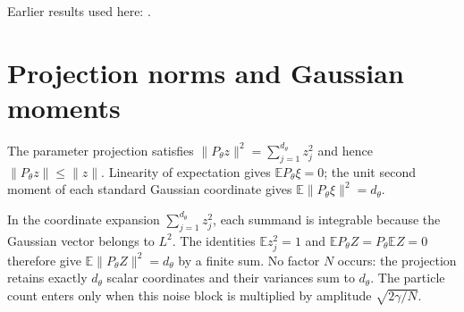 \documentclass[11pt,a4paper]{article}
\begin{document}
Earlier results used here: \cite[Section~3.1.1]{LangevinLean2026IPLA}.

\section{\texorpdfstring{Projection norms and Gaussian moments}{Projection norms and Gaussian moments}}


The parameter projection satisfies \(\|P_\theta z\|^2=\sum_{j=1}^{d_\theta}z_j^2\) and hence \(\|P_\theta z\|\le\|z\|\). Linearity of expectation gives \(\mathbb E P_\theta\xi=0\); the unit second moment of each standard Gaussian coordinate gives \(\mathbb E\|P_\theta\xi\|^2=d_\theta\).



In the coordinate expansion \(\sum_{j=1}^{d_\theta}z_j^2\), each summand is integrable because the Gaussian vector belongs to \(L^2\). The identities \(\mathbb E z_j^2=1\) and \(\mathbb E P_\theta Z=P_\theta\mathbb EZ=0\) therefore give \(\mathbb E\|P_\theta Z\|^2=d_\theta\) by a finite sum. No factor \(N\) occurs: the projection retains exactly \(d_\theta\) scalar coordinates and their variances sum to \(d_\theta\). The particle count enters only when this noise block is multiplied by amplitude \(\sqrt{2\gamma/N}\).
\end{document}
